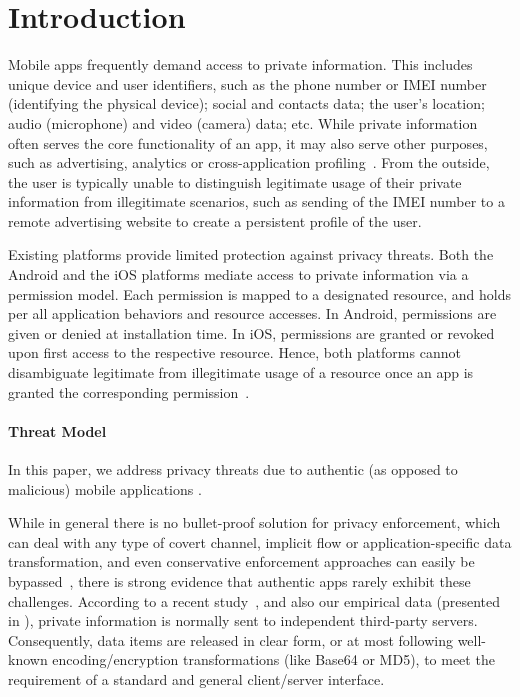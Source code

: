 \section{Introduction}\label{Se:introduction}

Mobile apps frequently demand access to private information. This includes unique device and user identifiers, such as the phone number or IMEI number (identifying the physical device); social and contacts data; the user's location; audio (microphone) and video (camera) data; etc. While private information often serves the core functionality of an app, it may also serve other purposes, such as advertising, analytics or cross-application profiling~\cite{HHJSW:CCS11}. From the outside, the user is typically unable to distinguish legitimate usage of their private information from illegitimate scenarios, such as sending of the IMEI number to a remote advertising website to create a persistent profile of the user.

Existing platforms provide limited protection against privacy threats. Both the Android and the iOS platforms mediate access to private information via a permission model. Each permission is mapped to a designated resource, and holds per all application behaviors and resource accesses. In Android,  permissions are given or denied at installation time. In iOS, permissions are granted or revoked upon first access to the respective resource. Hence, both platforms cannot disambiguate legitimate from illegitimate usage of a resource once an app is granted the corresponding permission~\cite{HMNRSKZ:ASE13}.

\paragraph{Threat Model} In this paper, we address privacy threats due to authentic (as opposed to malicious) mobile applications . 

While in general there is no bullet-proof solution for privacy enforcement, which can deal with any type of covert channel, implicit flow or application-specific data transformation, and even conservative enforcement approaches can easily be bypassed~\cite{SMBK:SECRYPT13}, there is strong evidence that authentic apps rarely exhibit these challenges. According to a recent study~\cite{HHJSW:CCS11}, and also our empirical data (presented in ), private information is normally sent to independent third-party servers. Consequently, data items are released in clear form, or at most following well-known encoding/encryption transformations (like Base64 or MD5), to meet the requirement of a standard and general client/server interface.

